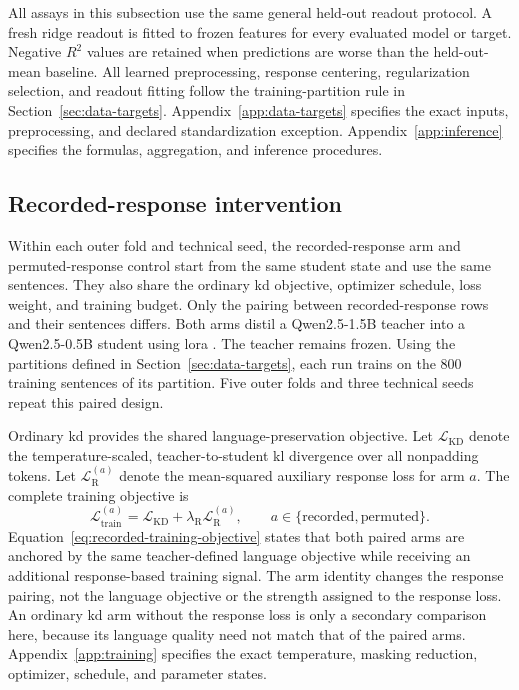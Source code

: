  All assays in this subsection use the same general held-out readout protocol.
A fresh ridge readout is fitted to frozen features for every evaluated model or target.
Negative \(R^2\) values are retained when predictions are worse than the held-out-mean baseline.
All learned preprocessing, response centering, regularization selection, and readout fitting follow the training-partition rule in Section~\ref{sec:data-targets}.
Appendix~\ref{app:data-targets} specifies the exact inputs, preprocessing, and declared standardization exception.
Appendix~\ref{app:inference} specifies the formulas, aggregation, and inference procedures.

\subsection{Recorded-response intervention}
\label{sec:recorded-intervention}

Within each outer fold and technical seed, the recorded-response arm and permuted-response control start from the same student state and use the same sentences.
They also share the ordinary \ac{kd} objective, optimizer schedule, loss weight, and training budget.
Only the pairing between recorded-response rows and their sentences differs.
Both arms distil a Qwen2.5-1.5B teacher into a Qwen2.5-0.5B student using \ac{lora} \autocite{hu2022}.
The teacher remains frozen.
Using the partitions defined in Section~\ref{sec:data-targets}, each run trains on the 800 training sentences of its partition.
Five outer folds and three technical seeds repeat this paired design.

Ordinary \ac{kd} provides the shared language-preservation objective.
Let \(\mathcal L_{\mathrm{KD}}\) denote the temperature-scaled, teacher-to-student \ac{kl} divergence over all nonpadding tokens.
Let \(\mathcal L_{\mathrm{R}}^{(a)}\) denote the mean-squared auxiliary response loss for arm \(a\).
The complete training objective is
\begin{equation}
\mathcal L_{\mathrm{train}}^{(a)}
=
\mathcal L_{\mathrm{KD}}
+
\lambda_{\mathrm{R}}\mathcal L_{\mathrm{R}}^{(a)},
\qquad
a\in\{\mathrm{recorded},\mathrm{permuted}\}.
\label{eq:recorded-training-objective}
\end{equation}
Equation~\ref{eq:recorded-training-objective} states that both paired arms are anchored by the same teacher-defined language objective while receiving an additional response-based training signal.
The arm identity changes the response pairing, not the language objective or the strength assigned to the response loss.
An ordinary \ac{kd} arm without the response loss is only a secondary comparison here, because its language quality need not match that of the paired arms.
Appendix~\ref{app:training} specifies the exact temperature, masking reduction, optimizer, schedule, and parameter states.

